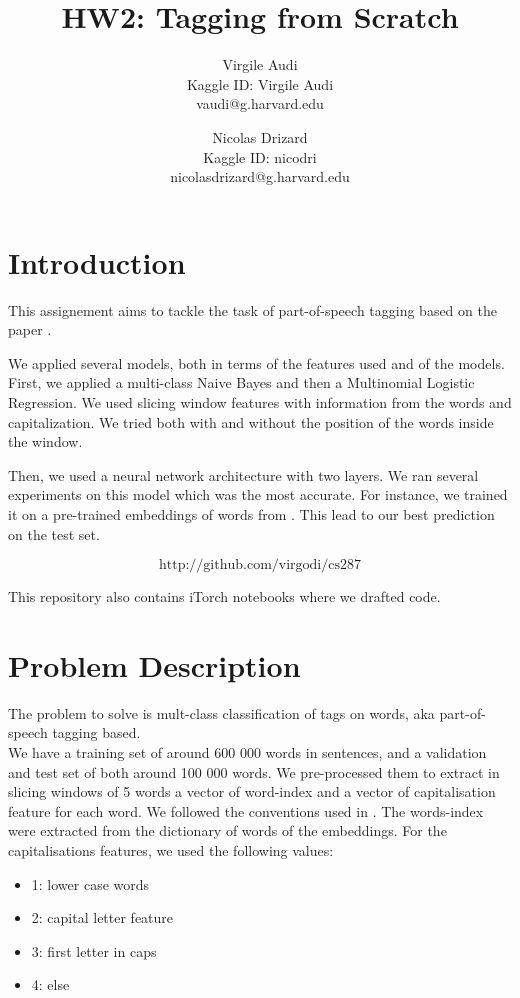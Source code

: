 \documentclass[11pt]{article}
\title{HW2: Tagging from Scratch}
\author{Virgile Audi \\ Kaggle ID: Virgile Audi \\ vaudi@g.harvard.edu \and Nicolas Drizard \\ Kaggle ID: nicodri \\ nicolasdrizard@g.harvard.edu }
\begin{document}
\maketitle{}
\section{Introduction}

This assignement aims to tackle the task of part-of-speech tagging based on the paper \cite{Collobert}.

We applied several models, both in terms of the features used and of the models. First, we applied a multi-class Naive Bayes and then a Multinomial Logistic Regression. We used slicing window features with information from the words and capitalization. We tried both with and without the position of the words inside the window.

Then, we used a neural network architecture with two layers. We ran several experiments on this model which was the most accurate. For instance, we trained it on a pre-trained embeddings of words from \cite{pennington}. This lead to our best prediction on the test set.

$$\text{http://github.com/virgodi/cs287}$$

This repository also contains iTorch notebooks where we drafted code.


\section{Problem Description}

The problem to solve is mult-class classification of tags on words, aka part-of-speech tagging based.\\


We have a training set of around 600 000 words in sentences, and a validation and test set of both around 100 000 words. We pre-processed them to extract in slicing windows of 5 words a vector of word-index and a vector of capitalisation feature for each word. We followed the conventions used in \cite{Collobert}. The words-index were extracted from the dictionary of words of the embeddings. For the capitalisations features, we used the following values:
\begin{itemize}
\item 1: lower case words
\item 2: capital letter feature
\item 3: first letter in caps
\item 4: else
\end{itemize}
\end{document}
